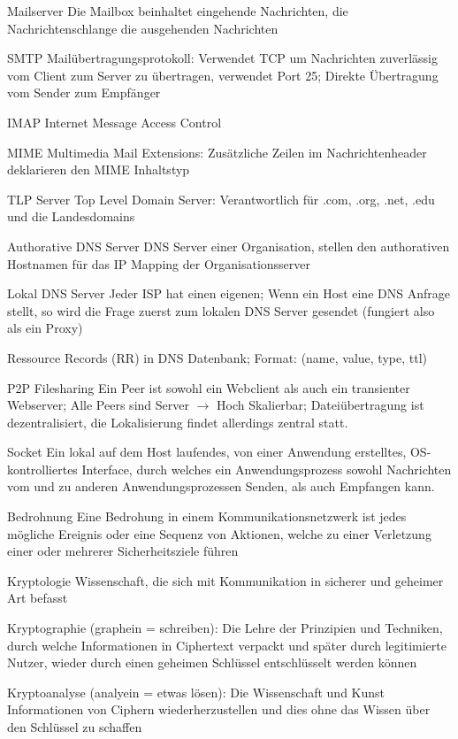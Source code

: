 \documentclass[10pt,landscape]{article}
\begin{document}
\begin{multicols}{3}
\begin{description*}
        \item[Mailserver] Die Mailbox beinhaltet eingehende Nachrichten, die Nachrichtenschlange die ausgehenden Nachrichten
        \item[SMTP] Mailübertragungsprotokoll: Verwendet TCP um Nachrichten zuverlässig vom Client zum Server zu übertragen, verwendet Port 25; Direkte Übertragung vom Sender zum Empfänger
        \item[IMAP] Internet Message Access Control
        \item[MIME] Multimedia Mail Extensions: Zusätzliche Zeilen im Nachrichtenheader deklarieren den MIME Inhaltstyp
        \item[TLP Server] Top Level Domain Server: Verantwortlich für .com, .org, .net, .edu und die Landesdomains
        \item[Authorative DNS Server] DNS Server einer Organisation, stellen den authorativen Hostnamen für das IP Mapping der Organisationsserver
        \item[Lokal DNS Server] Jeder ISP hat einen eigenen; Wenn ein Host eine DNS Anfrage stellt, so wird die Frage zuerst zum lokalen DNS Server gesendet (fungiert also als ein Proxy)
        \item[Ressource Records (RR)] in DNS Datenbank; Format: (name, value, type, ttl)
        \item[P2P Filesharing] Ein Peer ist sowohl ein Webclient als auch ein transienter Webserver; Alle Peers sind Server $\rightarrow$ Hoch Skalierbar; Dateiübertragung ist dezentralisiert, die Lokalisierung findet allerdings zentral statt.
        \item[Socket] Ein lokal auf dem Host laufendes, von einer Anwendung erstelltes, OS-kontrolliertes Interface, durch welches ein Anwendungsprozess sowohl Nachrichten vom und zu anderen Anwendungsprozessen Senden, als auch Empfangen kann.
        \item[Bedrohnung] Eine Bedrohung in einem Kommunikationsnetzwerk ist jedes mögliche Ereignis oder eine Sequenz von Aktionen, welche zu einer Verletzung einer oder mehrerer Sicherheitsziele führen
        \item[Kryptologie] Wissenschaft, die sich mit Kommunikation in sicherer und geheimer Art befasst
        \item[Kryptographie] (graphein = schreiben): Die Lehre der Prinzipien und Techniken, durch welche Informationen in Ciphertext verpackt und später durch legitimierte Nutzer, wieder durch einen geheimen Schlüssel entschlüsselt werden können
        \item[Kryptoanalyse] (analyein = etwas lösen): Die Wissenschaft und Kunst Informationen von Ciphern wiederherzustellen und dies ohne das Wissen über den Schlüssel zu schaffen

\end{description*}
\end{multicols}
\end{document}

